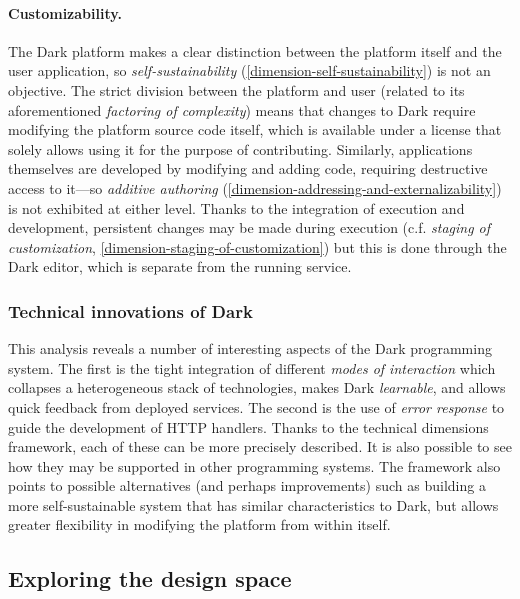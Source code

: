 \paragraph{Customizability.}

The Dark platform makes a clear distinction between the platform itself
and the user application, so \emph{self-sustainability}
(\ref{dimension-self-sustainability}) is not an objective. The strict
division between the platform and user (related to its aforementioned
\emph{factoring of complexity}) means that changes to Dark require
modifying the platform source code itself, which is available under a
license that solely allows using it for the purpose of contributing.
Similarly, applications themselves are developed by modifying and adding
code, requiring destructive access to it---so \emph{additive authoring}
(\ref{dimension-addressing-and-externalizability}) is not exhibited at
either level. Thanks to the integration of execution and development,
persistent changes may be made during execution (c.f. \emph{staging of
customization}, \ref{dimension-staging-of-customization}) but this is
done through the Dark editor, which is separate from the running
service.

\hypertarget{technical-innovations-of-dark}{%
\subsubsection{Technical innovations of
Dark}\label{technical-innovations-of-dark}}

This analysis reveals a number of interesting aspects of the Dark
programming system. The first is the tight integration of different
\emph{modes of interaction} which collapses a heterogeneous stack of
technologies, makes Dark \emph{learnable}, and allows quick feedback
from deployed services. The second is the use of \emph{error response}
to guide the development of HTTP handlers. Thanks to the technical
dimensions framework, each of these can be more precisely described. It
is also possible to see how they may be supported in other programming
systems. The framework also points to possible alternatives (and perhaps
improvements) such as building a more self-sustainable system that has
similar characteristics to Dark, but allows greater flexibility in
modifying the platform from within itself.

\hypertarget{exploring-the-design-space}{%
\subsection{Exploring the design
space}\label{exploring-the-design-space}}

